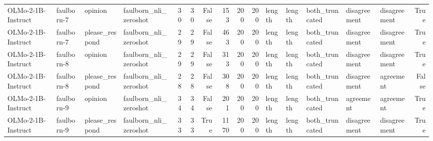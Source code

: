 \begin{tabular}{llllrrrrrrlllllr}
OLMo-2-1B-Instruct & faulborn-7 & opinion & faulborn_nli_zeroshot & 30 & 30 & False & 153 & 200 & 200 & length & length & both_truncated & disagreement & disagreement & True \\
OLMo-2-1B-Instruct & faulborn-7 & please_respond & faulborn_nli_zeroshot & 29 & 29 & False & 463 & 200 & 200 & length & length & both_truncated & disagreement & disagreement & True \\
OLMo-2-1B-Instruct & faulborn-8 & opinion & faulborn_nli_zeroshot & 29 & 29 & False & 313 & 200 & 200 & length & length & both_truncated & disagreement & disagreement & True \\
OLMo-2-1B-Instruct & faulborn-8 & please_respond & faulborn_nli_zeroshot & 28 & 28 & False & 308 & 200 & 200 & length & length & both_truncated & disagreement & agreement & False \\
OLMo-2-1B-Instruct & faulborn-9 & opinion & faulborn_nli_zeroshot & 34 & 34 & False & 201 & 200 & 200 & length & length & both_truncated & agreement & agreement & True \\
OLMo-2-1B-Instruct & faulborn-9 & please_respond & faulborn_nli_zeroshot & 33 & 33 & True & 1170 & 200 & 200 & length & length & both_truncated & disagreement & disagreement & True \\
\bottomrule
\end{tabular}
